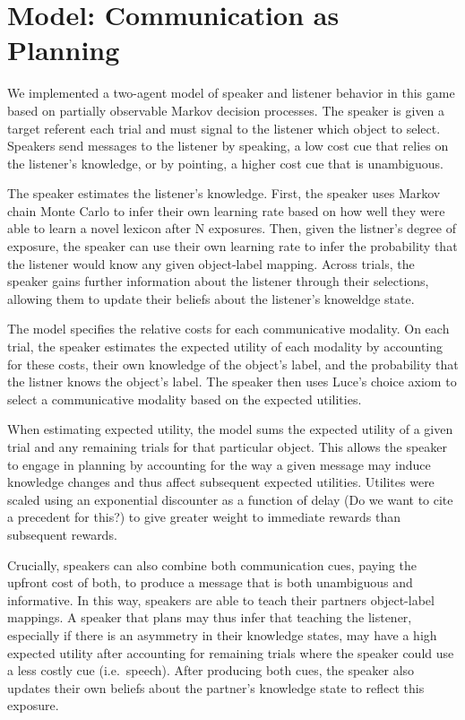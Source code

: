 \documentclass[10pt, letterpaper]{article}
\begin{document}
\section{Model: Communication as
Planning}\label{model-communication-as-planning}

We implemented a two-agent model of speaker and listener behavior in
this game based on partially observable Markov decision processes. The
speaker is given a target referent each trial and must signal to the
listener which object to select. Speakers send messages to the listener
by speaking, a low cost cue that relies on the listener's knowledge, or
by pointing, a higher cost cue that is unambiguous.

The speaker estimates the listener's knowledge. First, the speaker uses
Markov chain Monte Carlo to infer their own learning rate based on how
well they were able to learn a novel lexicon after N exposures. Then,
given the listner's degree of exposure, the speaker can use their own
learning rate to infer the probability that the listener would know any
given object-label mapping. Across trials, the speaker gains further
information about the listener through their selections, allowing them
to update their beliefs about the listener's knoweldge state.

The model specifies the relative costs for each communicative modality.
On each trial, the speaker estimates the expected utility of each
modality by accounting for these costs, their own knowledge of the
object's label, and the probability that the listner knows the object's
label. The speaker then uses Luce's choice axiom to select a
communicative modality based on the expected utilities.

When estimating expected utility, the model sums the expected utility of
a given trial and any remaining trials for that particular object. This
allows the speaker to engage in planning by accounting for the way a
given message may induce knowledge changes and thus affect subsequent
expected utilities. Utilites were scaled using an exponential discounter
as a function of delay (Do we want to cite a precedent for this?) to
give greater weight to immediate rewards than subsequent rewards.

Crucially, speakers can also combine both communication cues, paying the
upfront cost of both, to produce a message that is both unambiguous and
informative. In this way, speakers are able to teach their partners
object-label mappings. A speaker that plans may thus infer that teaching
the listener, especially if there is an asymmetry in their knowledge
states, may have a high expected utility after accounting for remaining
trials where the speaker could use a less costly cue (i.e.~speech).
After producing both cues, the speaker also updates their own beliefs
about the partner's knowledge state to reflect this exposure.
\end{document}
